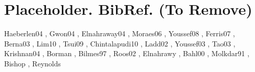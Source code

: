 \documentclass{Localization-PaperWriteupDraft}
\begin{document}
\section{Placeholder. BibRef. (To Remove)}
Haeberlen04 \cite{Haeberlen:2004:PRL:1023720.1023728},
Gwon04 \cite{Gwon:2004:ECC:1023783.1023786},
Elnahraway04 \cite{Elnahraway:2004:LLU:1031495.1031537},
Moraes06 \cite{Moraes:2006:CWL:1164783.1164799},
Youssef08 \cite{Youssef:2008:HLD:1399551.1399558},
Ferris07 \cite{Ferris:2007:WUG:1625275.1625675},
Berna03 \cite{Berna:2003:LAL:1630659.1630885},
Lim10 \cite{Lim:2010:ZIL:1741400.1741464},
Tsui09 \cite{Tsui:2009:ULS:1741410.1741596},
Chintalapudi10 \cite{Chintalapudi:2010:ILW:1859995.1860016},
Ladd02 \cite{Ladd:2002:RLS:570645.570674},
Youssef03 \cite{Youssef:2003:WLD:826025.826335},
Tao03 \cite{Tao:2003:WLL:941311.941314},
Krishnan04 \cite{Krishnan04asystem},
Borman \cite{Borman_theexpectation},
Bilmes97 \cite{Bilmes97agentle},
Roos02 \cite{Roos},
Elnahrawy \cite{Elnahrawy05bayesianindoor},
Bahl00 \cite{Bahl00radar:an},
Molkdar91 \cite{Molkdar},
Bishop \cite{Bishop:2006:PRM:1162264},
Reynolds \cite{Reynolds}


%
%
\end{document}
